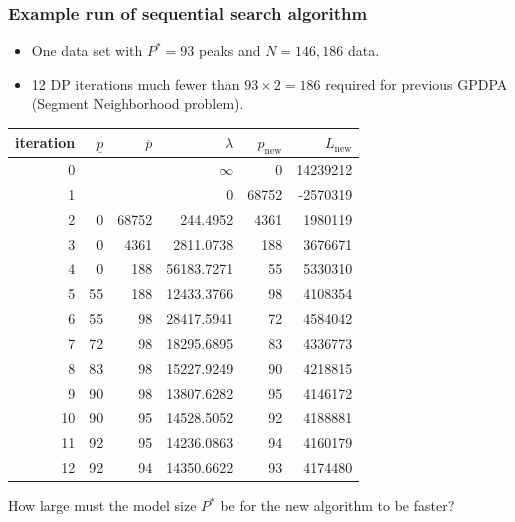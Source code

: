 \documentclass[t]{beamer}
\begin{document}
\begin{frame}
  \frametitle{Example run of sequential search algorithm }
  \begin{itemize}
  \item One data set with $P^*=93$ peaks and $N=146,186$ data.
  \item 12 DP iterations much fewer than $93\times 2=186$ required for previous GPDPA (Segment Neighborhood problem).
  \end{itemize}
\small
  \begin{tabular}{rrrrrr}
 iteration& $\underline p$& $\overline p$&    $\lambda$ & $p_{\text{new}}$& $L_{\text{new}}$\\
\hline
         0&    &    &        $\infty$&     0&   14239212\\
         1&    &    &     0& 68752&   -2570319\\
         2&     0& 68752&   244.4952&  4361&    1980119\\
         3&     0&  4361&  2811.0738&   188&    3676671\\
         4&     0&   188& 56183.7271&    55&    5330310\\
         5&    55&   188& 12433.3766&    98&    4108354\\
         6&    55&    98& 28417.5941&    72&    4584042\\
         7&    72&    98& 18295.6895&    83&    4336773\\
         8&    83&    98& 15227.9249&    90&    4218815\\
         9&    90&    98& 13807.6282&    95&    4146172\\
        10&    90&    95& 14528.5052&    92&    4188881\\
        11&    92&    95& 14236.0863&    94&    4160179\\
        12&    92&    94& 14350.6622&    93&    4174480
  \end{tabular}

How large must the model size $P^*$ be for the new algorithm to be faster?

\end{frame}
\end{document}

